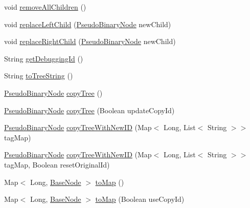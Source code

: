 \begin{DoxyCompactItemize}
\item 
void \hyperlink{classit_1_1emarolab_1_1cagg_1_1core_1_1PseudoBinaryNode_a9674006717b57e17a9831be416e2ae5b}{remove\-All\-Children} ()
\item 
void \hyperlink{classit_1_1emarolab_1_1cagg_1_1core_1_1PseudoBinaryNode_a2e9aa4259a2d79d52c5e4b9f72a0b0bc}{replace\-Left\-Child} (\hyperlink{classit_1_1emarolab_1_1cagg_1_1core_1_1PseudoBinaryNode}{Pseudo\-Binary\-Node} new\-Child)
\item 
void \hyperlink{classit_1_1emarolab_1_1cagg_1_1core_1_1PseudoBinaryNode_a90aaf8af699196af78bffc5f704b503f}{replace\-Right\-Child} (\hyperlink{classit_1_1emarolab_1_1cagg_1_1core_1_1PseudoBinaryNode}{Pseudo\-Binary\-Node} new\-Child)
\item 
String \hyperlink{classit_1_1emarolab_1_1cagg_1_1core_1_1PseudoBinaryNode_a0e89102020913ee33a723f5d700ac2d1}{get\-Debugging\-Id} ()
\item 
String \hyperlink{classit_1_1emarolab_1_1cagg_1_1core_1_1PseudoBinaryNode_a5a3e04bfa8c5de3ff0cbf30ce6042d30}{to\-Tree\-String} ()
\item 
\hyperlink{classit_1_1emarolab_1_1cagg_1_1core_1_1PseudoBinaryNode}{Pseudo\-Binary\-Node} \hyperlink{classit_1_1emarolab_1_1cagg_1_1core_1_1PseudoBinaryNode_ac5cf90608e72c0cb43eb7b0a5bd38cb3}{copy\-Tree} ()
\item 
\hyperlink{classit_1_1emarolab_1_1cagg_1_1core_1_1PseudoBinaryNode}{Pseudo\-Binary\-Node} \hyperlink{classit_1_1emarolab_1_1cagg_1_1core_1_1PseudoBinaryNode_a7e8744ed732bbdddc523a9f46d4c26bf}{copy\-Tree} (Boolean update\-Copy\-Id)
\item 
\hyperlink{classit_1_1emarolab_1_1cagg_1_1core_1_1PseudoBinaryNode}{Pseudo\-Binary\-Node} \hyperlink{classit_1_1emarolab_1_1cagg_1_1core_1_1PseudoBinaryNode_af94c5d62ec0e7b56687be8148f764aaf}{copy\-Tree\-With\-New\-I\-D} (Map$<$ Long, List$<$ String $>$$>$ tag\-Map)
\item 
\hyperlink{classit_1_1emarolab_1_1cagg_1_1core_1_1PseudoBinaryNode}{Pseudo\-Binary\-Node} \hyperlink{classit_1_1emarolab_1_1cagg_1_1core_1_1PseudoBinaryNode_a67f198854b278ed43ecc66dc47e696e5}{copy\-Tree\-With\-New\-I\-D} (Map$<$ Long, List$<$ String $>$$>$ tag\-Map, Boolean reset\-Original\-Id)
\item 
Map$<$ Long, \hyperlink{classit_1_1emarolab_1_1cagg_1_1core_1_1BaseNode}{Base\-Node} $>$ \hyperlink{classit_1_1emarolab_1_1cagg_1_1core_1_1PseudoBinaryNode_af57d42da5633e50e81d09db3f1074dd7}{to\-Map} ()
\item 
Map$<$ Long, \hyperlink{classit_1_1emarolab_1_1cagg_1_1core_1_1BaseNode}{Base\-Node} $>$ \hyperlink{classit_1_1emarolab_1_1cagg_1_1core_1_1PseudoBinaryNode_ab87511a0691b1dd8160adeb76c922bec}{to\-Map} (Boolean use\-Copy\-Id)

\end{DoxyCompactItemize}
